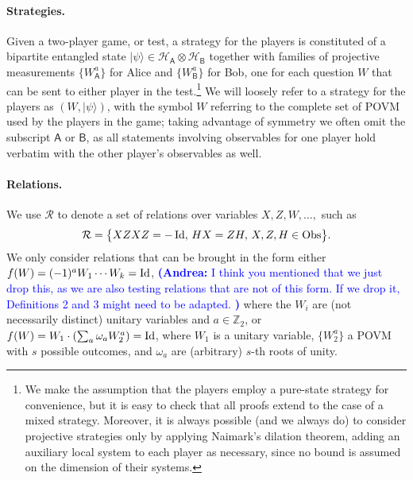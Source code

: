 \documentclass[11pt]{article}
\theoremstyle{remark}
\theoremstyle{definition}
\newcommand{\ket}[1]{|#1\rangle}
\newcommand{\Id}{\ensuremath{\mathop{\rm Id}\nolimits}}
\newcommand{\reg}[1]{{\textsf{#1}}}
\newcommand{\Z}{\ensuremath{\mathbb{Z}}}
\newcommand{\mH}{\mathcal{H}}
\newcommand{\setft}[1]{\mathrm{#1}}
\newcommand{\Obs}{\setft{Obs}}
\newcommand{\anote}[1]{\textcolor{blue}{\small {\textbf{(Andrea:} #1 \textbf{) }}}}
\begin{document}
\paragraph{Strategies.} Given a two-player game, or test, a strategy for the players is constituted of a bipartite entangled state $\ket{\psi} \in \mH_\reg{A} \otimes \mH_\reg{B}$ together with families of projective  measurements $\{W^a_\reg{A}\}$ for Alice and $\{W_\reg{B}^a\}$ for Bob, one for each question $W$ that can be sent to either player in the test.\footnote{We make the assumption that the players employ a pure-state strategy for convenience, but it is easy to check that all proofs extend to the case of a mixed strategy. Moreover, it is always possible (and we always do) to consider projective strategies only by applying Naimark's dilation theorem, adding an auxiliary local system to each player as necessary, since no bound is assumed on the dimension of their systems.}  %
We will loosely refer to a strategy for the players as $(W,\ket{\psi})$, with the symbol $W$ referring to the complete set of POVM used by the players in the game; taking advantage of  symmetry we often omit the subscript $\reg{A}$ or $\reg{B}$, as all statements involving observables for one player hold verbatim with the other player's observables as well. 

\paragraph{Relations.}
We use $\mathcal{R}$ to denote a set of relations over variables $X,Z,W,\ldots,$ such as
$$\mathcal{R}=\big\{XZXZ=-\Id,\, HX=ZH,\,X,Z,H\in\Obs\big\}.$$
We only consider relations that can be brought in the form either $f(W) = (-1)^a W_1\cdots W_k = \Id$, \anote{I think you mentioned that we just drop this, as we are also testing relations that are not of this form. If we drop it, Definitions 2 and 3 might need to be adapted.}where the $W_i$ are (not necessarily distinct) unitary variables and $a\in\Z_2$, or $f(W) = W_1 \cdot ( \sum_a \omega_a W_2^a)=\Id$, where $W_1$ is a unitary variable, $\{W_2^a\}$ a POVM with $s$ possible outcomes, and $\omega_a$ are (arbitrary) $s$-th roots of unity.   
\end{document}
